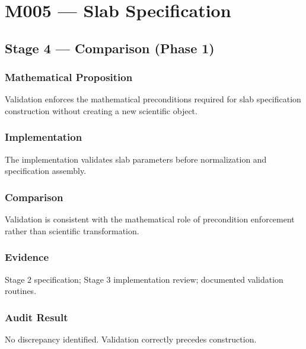 \chapter{M005 --- Slab Specification}

\section{Stage 4 --- Comparison (Phase 1)}

\subsection{Mathematical Proposition}

Validation enforces the mathematical preconditions required for slab
specification construction without creating a new scientific object.

\subsection{Implementation}

The implementation validates slab parameters before normalization and
specification assembly.

\subsection{Comparison}

Validation is consistent with the mathematical role of precondition
enforcement rather than scientific transformation.

\subsection{Evidence}

Stage 2 specification; Stage 3 implementation review; documented
validation routines.

\subsection{Audit Result}

No discrepancy identified. Validation correctly precedes construction.
